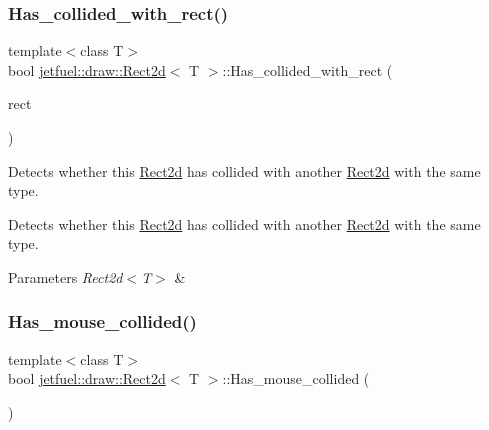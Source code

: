 \subsubsection{\texorpdfstring{Has\+\_\+collided\+\_\+with\+\_\+rect()}{Has\_collided\_with\_rect()}}
{\footnotesize\ttfamily template$<$class T$>$ \\
bool \hyperlink{classjetfuel_1_1draw_1_1Rect2d}{jetfuel\+::draw\+::\+Rect2d}$<$ T $>$\+::Has\+\_\+collided\+\_\+with\+\_\+rect (\begin{DoxyParamCaption}\item[{\hyperlink{classjetfuel_1_1draw_1_1Rect2d}{jetfuel\+::draw\+::\+Rect2d}$<$ T $>$}]{rect }\end{DoxyParamCaption})\hspace{0.3cm}{\ttfamily [inline]}}



Detects whether this \hyperlink{classjetfuel_1_1draw_1_1Rect2d}{Rect2d} has collided with another \hyperlink{classjetfuel_1_1draw_1_1Rect2d}{Rect2d} with the same type. 

Detects whether this \hyperlink{classjetfuel_1_1draw_1_1Rect2d}{Rect2d} has collided with another \hyperlink{classjetfuel_1_1draw_1_1Rect2d}{Rect2d} with the same type.


\begin{DoxyParams}{Parameters}
{\em Rect2d$<$\+T$>$} & \\
\hline
\end{DoxyParams}
\mbox{\label{classjetfuel_1_1draw_1_1Rect2d_affa3a06a40154e71485b9676710f6d0d}} 
\subsubsection{\texorpdfstring{Has\+\_\+mouse\+\_\+collided()}{Has\_mouse\_collided()}}
{\footnotesize\ttfamily template$<$class T$>$ \\
bool \hyperlink{classjetfuel_1_1draw_1_1Rect2d}{jetfuel\+::draw\+::\+Rect2d}$<$ T $>$\+::Has\+\_\+mouse\+\_\+collided (\begin{DoxyParamCaption}{ }\end{DoxyParamCaption})\hspace{0.3cm}{\ttfamily [inline]}}



